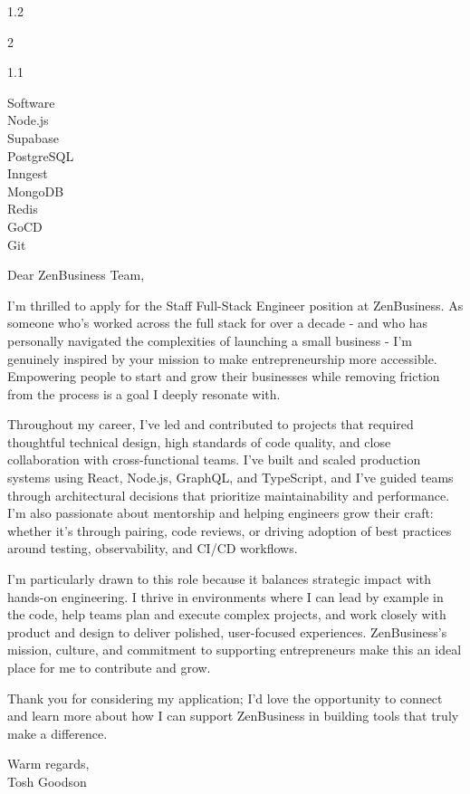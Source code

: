 \documentclass{resume}
\begin{document}
\begin{spacing}{1.2}
\begin{paracol}{2}
\begin{flushright}
\begin{spacing}{1.1}
				\medskip

				{\color{subcontent} \footnotesize Software}\\
				\smallskip
				Node.js\\
				Supabase\\
				PostgreSQL\\
				Inngest\\
				MongoDB\\
				Redis\\
				GoCD\\
				Git
			\end{spacing}
		\end{flushright}

		\switchcolumn

		Dear ZenBusiness Team,

		\bigskip
		
		I’m thrilled to apply for the Staff Full-Stack Engineer position at ZenBusiness. As someone who’s worked across the full stack for over a decade - and who has personally navigated the complexities of launching a small business - I’m genuinely inspired by your mission to make entrepreneurship more accessible. Empowering people to start and grow their businesses while removing friction from the process is a goal I deeply resonate with.

		\bigskip
		
		Throughout my career, I’ve led and contributed to projects that required thoughtful technical design, high standards of code quality, and close collaboration with cross-functional teams. I’ve built and scaled production systems using React, Node.js, GraphQL, and TypeScript, and I’ve guided teams through architectural decisions that prioritize maintainability and performance. I’m also passionate about mentorship and helping engineers grow their craft: whether it’s through pairing, code reviews, or driving adoption of best practices around testing, observability, and CI/CD workflows.

		\bigskip

		I’m particularly drawn to this role because it balances strategic impact with hands-on engineering. I thrive in environments where I can lead by example in the code, help teams plan and execute complex projects, and work closely with product and design to deliver polished, user-focused experiences. ZenBusiness’s mission, culture, and commitment to supporting entrepreneurs make this an ideal place for me to contribute and grow.

		\bigskip

		Thank you for considering my application; I’d love the opportunity to connect and learn more about how I can support ZenBusiness in building tools that truly make a difference.

		\bigskip
		\bigskip

		Warm regards,\\
		Tosh Goodson
	\end{paracol}
\end{spacing}
\end{document}
